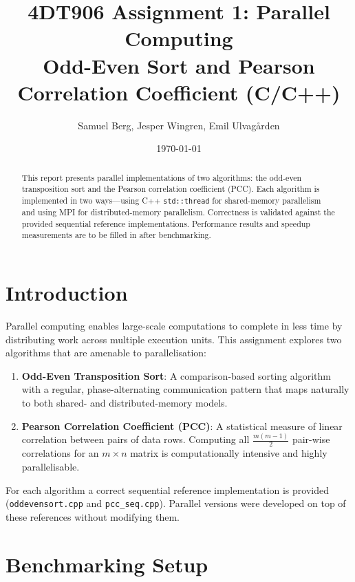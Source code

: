 \documentclass[11pt,a4paper]{article}
\title{4DT906 Assignment 1: Parallel Computing\\
Odd-Even Sort and Pearson Correlation Coefficient (C/C++)}
\author{Samuel Berg, Jesper Wingren, Emil Ulvagården}
\date{\today}
\begin{document}
\maketitle

\begin{abstract}
This report presents parallel implementations of two algorithms: the odd-even transposition sort
and the Pearson correlation coefficient (PCC). Each algorithm is implemented in two ways---using
C++ \texttt{std::thread} for shared-memory parallelism and using MPI for distributed-memory
parallelism. Correctness is validated against the provided sequential reference implementations.
Performance results and speedup measurements are to be filled in after benchmarking.
\end{abstract}

\tableofcontents
\newpage

\section{Introduction}

Parallel computing enables large-scale computations to complete in less time by distributing work
across multiple execution units. This assignment explores two algorithms that are amenable to
parallelisation:

\begin{enumerate}
    \item \textbf{Odd-Even Transposition Sort}: A comparison-based sorting algorithm with a
          regular, phase-alternating communication pattern that maps naturally to both shared- and
          distributed-memory models.
    \item \textbf{Pearson Correlation Coefficient (PCC)}: A statistical measure of linear
          correlation between pairs of data rows. Computing all $\frac{m(m-1)}{2}$ pair-wise
          correlations for an $m \times n$ matrix is computationally intensive and highly
          parallelisable.
\end{enumerate}

For each algorithm a correct sequential reference implementation is provided
(\texttt{oddevensort.cpp} and \texttt{pcc\_seq.cpp}). Parallel versions were developed on top of
these references without modifying them.

\section{Benchmarking Setup}
\end{document}
